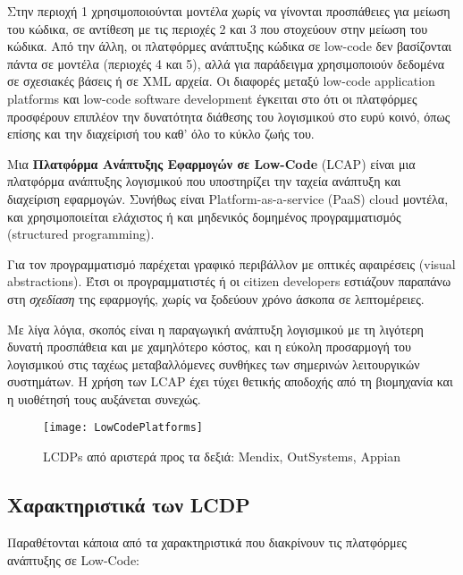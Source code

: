         \vspace{-2em}
        \begin{displayquote}
            \small Στην περιοχή 1 χρησιμοποιούνται μοντέλα χωρίς να γίνονται προσπάθειες για μείωση του κώδικα, σε αντίθεση με τις περιοχές 2 και 3 που στοχεύουν στην μείωση του κώδικα. Από την άλλη, οι πλατφόρμες ανάπτυξης κώδικα σε low-code δεν βασίζονται πάντα σε μοντέλα (περιοχές 4 και 5), αλλά για παράδειγμα χρησιμοποιούν δεδομένα σε σχεσιακές βάσεις ή σε XML αρχεία. Οι διαφορές μεταξύ low-code application platforms και low-code software development έγκειται στο ότι οι πλατφόρμες προσφέρουν επιπλέον την δυνατότητα διάθεσης του λογισμικού στο ευρύ κοινό, όπως επίσης και την διαχείρισή του καθ' όλο το κύκλο ζωής του.
        \end{displayquote}

        Μια \textbf{Πλατφόρμα Ανάπτυξης Εφαρμογών σε Low-Code} (LCAP) είναι μια πλατφόρμα ανάπτυξης λογισμικού που υποστηρίζει την ταχεία ανάπτυξη και διαχείριση εφαρμογών. Συνήθως είναι Platform-as-a-service (PaaS) cloud μοντέλα, και χρησιμοποιείται ελάχιστος ή και μηδενικός δομημένος προγραμματισμός (structured \linebreak programming).

        Για τον προγραμματισμό παρέχεται γραφικό περιβάλλον με οπτικές αφαιρέσεις (visual abstractions). Έτσι οι προγραμματιστές ή οι citizen developers εστιάζουν παραπάνω στη \textit{σχεδίαση} της εφαρμογής, χωρίς να ξοδεύουν χρόνο άσκοπα σε λεπτομέρειες.

        Με λίγα λόγια, σκοπός είναι η παραγωγική ανάπτυξη λογισμικού με τη λιγότερη δυνατή προσπάθεια και με χαμηλότερο κόστος, και η εύκολη προσαρμογή του λογισμικού στις ταχέως μεταβαλλόμενες συνθήκες των σημερινών λειτουργικών συστημάτων. Η χρήση των LCAP έχει τύχει θετικής αποδοχής από τη βιομηχανία και η υιοθέτησή τους αυξάνεται συνεχώς. \cite{Bock2021,Bucaioni2022,Sahay2020}

        \begin{figure}[H] \noindent \centering
                \texttt{[image: LowCodePlatforms]}
                \caption{LCDPs από αριστερά προς τα δεξιά: Mendix, OutSystems, Appian \cite{LowCodeMendix}}
        \end{figure}

        \subsection{Χαρακτηριστικά των LCDP}
            Παραθέτονται κάποια από τα χαρακτηριστικά που διακρίνουν τις πλατφόρμες ανάπτυξης σε Low-Code:

